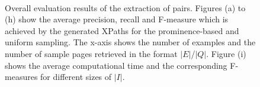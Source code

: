 \begin{figure}[htb!]
        ~
        ~
\caption[Overall evaluation results of REX]{Overall evaluation results of the extraction of pairs. Figures (a) to (h) show the average precision, recall and F-measure which is achiev\-ed by the generated XPaths for the prominence-based and uniform sampling. The x-axis shows the number of examples and the number of sample pages retrieved in the format $|E|$/$|Q|$. Figure (i) shows the average computational time and the corresponding F-measures for different sizes of $|I|$.}
\label{charex:fig:overall-XPaths}
\end{figure}



